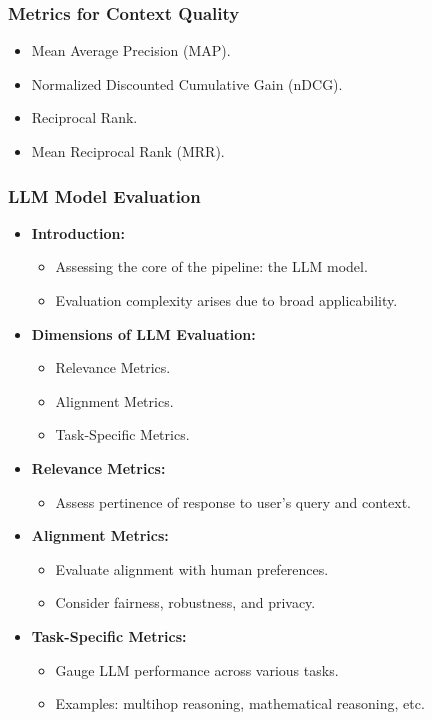 \begin{frame}[fragile]\frametitle{Metrics for Context Quality}

\begin{itemize}
\item Mean Average Precision (MAP).
\item Normalized Discounted Cumulative Gain (nDCG).
\item Reciprocal Rank.
\item Mean Reciprocal Rank (MRR).
\end{itemize}

\end{frame}


\begin{frame}[fragile]\frametitle{LLM Model Evaluation}
  \begin{itemize}
    \item \textbf{Introduction:}
      \begin{itemize}
        \item Assessing the core of the pipeline: the LLM model.
        \item Evaluation complexity arises due to broad applicability.
      \end{itemize}
    \item \textbf{Dimensions of LLM Evaluation:}
      \begin{itemize}
        \item Relevance Metrics.
        \item Alignment Metrics.
        \item Task-Specific Metrics.
      \end{itemize}
    \item \textbf{Relevance Metrics:}
      \begin{itemize}
        \item Assess pertinence of response to user's query and context.
      \end{itemize}
    \item \textbf{Alignment Metrics:}
      \begin{itemize}
        \item Evaluate alignment with human preferences.
        \item Consider fairness, robustness, and privacy.
      \end{itemize}
    \item \textbf{Task-Specific Metrics:}
      \begin{itemize}
        \item Gauge LLM performance across various tasks.
        \item Examples: multihop reasoning, mathematical reasoning, etc.
      \end{itemize}
  \end{itemize}
\end{frame}

